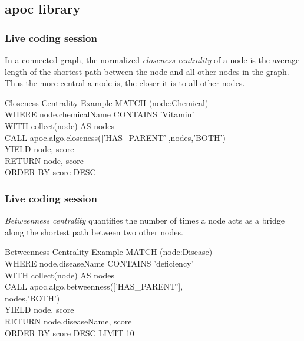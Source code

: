 \documentclass[12pt]{beamer}
\begin{document}
    \subsection{apoc library}
    \begin{frame}
        \frametitle{Live coding session}
        \begin{Definition}
            In a connected graph, the normalized \emph{closeness centrality} of a node is the average length of the shortest path between the node and all other nodes in the graph. Thus the more central a node is, the closer it is to all other nodes.\footnotemark
        \end{Definition}
        \begin{block}{Closeness Centrality Example}
            MATCH (node:Chemical)\\
            \hspace{1cm} WHERE node.chemicalName CONTAINS 'Vitamin'\\
            \hspace{1cm} WITH collect(node) AS nodes\\
            CALL apoc.algo.closeness(['HAS\_PARENT'],nodes,'BOTH')\\
            \hspace{1cm} YIELD node, score\\
            RETURN node, score\\
            \hspace{1cm} ORDER BY score DESC
        \end{block}
    \end{frame}
    
    \begin{frame}
        \frametitle{Live coding session}
        \begin{Definition}
            \emph{Betweenness centrality} quantifies the number of times a node acts as a bridge along the shortest path between two other nodes.\footnotemark
        \end{Definition}
        \begin{block}{Betweenness Centrality Example}
            MATCH (node:Disease)\\
            \hspace{1cm} WHERE node.diseaseName CONTAINS 'deficiency'\\
            \hspace{1cm} WITH collect(node) AS nodes\\
            CALL apoc.algo.betweenness(['HAS\_PARENT'],\\
            \hspace{6cm} nodes,'BOTH')\\
            \hspace{1cm} YIELD node, score\\
            RETURN node.diseaseName, score\\
            \hspace{1cm} ORDER BY score DESC LIMIT 10
        \end{block}
    \end{frame}
    
\end{document}
